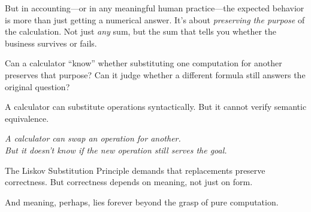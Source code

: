 \begin{tcolorbox}[colback=gray!5!white, colframe=black, breakable, title=\textbf{Sidebar: Can a Calculator Understand Accounting?},fonttitle=\bfseries]
  But in accounting—or in any meaningful human practice—the expected behavior is more than just getting a numerical answer. It’s about \emph{preserving the purpose} of the calculation. Not just \emph{any} sum, but the sum that tells you whether the business survives or fails.

  \medskip
  
  Can a calculator “know” whether substituting one computation for another preserves that purpose?  
  Can it judge whether a different formula still answers the original question?

  \medskip
  
  A calculator can substitute operations syntactically.  
  But it cannot verify semantic equivalence.

  \begin{center}
  \textit{A calculator can swap an operation for another.\\
  But it doesn’t know if the new operation still serves the goal.}
  \end{center}

  The Liskov Substitution Principle demands that replacements preserve correctness.  
  But correctness depends on meaning, not just on form.

  And meaning, perhaps, lies forever beyond the grasp of pure computation.

\end{tcolorbox}
